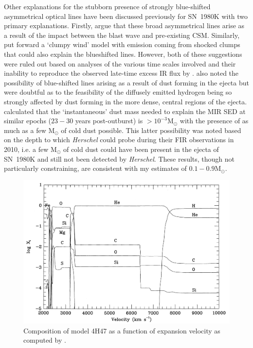 Other explanations for the stubborn presence of strongly blue-shifted asymmetrical optical lines have been discussed previously for SN~1980K  with two primary explanations.  Firstly, \citet{Fesen1990} argue that these broad asymmetrical lines arise as a result of the impact between the blast wave and pre-existing CSM.  Similarly, \citet{Chugai1994} put forward a `clumpy wind' model with emission coming from shocked clumps that could also explain the blueshifted lines.  However, both of these suggestions were ruled out based on analyses of the various time scales involved and their inability to reproduce the observed late-time excess IR flux by \citet{Sugerman2012}.  \citet{Fesen1990}  also noted the possibility of blue-shifted lines  arising as a result of dust forming in the ejecta but were doubtful as to the feasibility of the diffusely emitted hydrogen being so strongly affected by dust forming in the more dense, central regions of the ejecta.  \citet{Sugerman2012} calculated that the `instantaneous' dust mass needed to explain the MIR SED at similar epochs ($23-30$ years post-outburst) is $>10^{-3}$M$_{\odot}$ with the presence of as much as a few M$_{\odot}$ of cold dust possible.  This latter possibility was noted based on the depth to which {\em Herschel} could probe during their FIR observations in 2010, i.e. a few M$_{\odot}$ of cold dust could have been present in the ejecta of SN~1980K and still not been detected by {\em Herschel}.  These results, though not particularly constraining, are consistent with my estimates of $0.1-0.9$M$_{\odot}$.

\begin{figure}
\centering
\includegraphics[scale=0.4,clip=true, trim=30 0 0 0]{chapters/chapter6/figs/93J/explosion_model.png}
\caption{Composition of model 4H47 as a function of expansion velocity as computed by \citet{Nomoto1993}.}
\label{4h47}
\end{figure}

